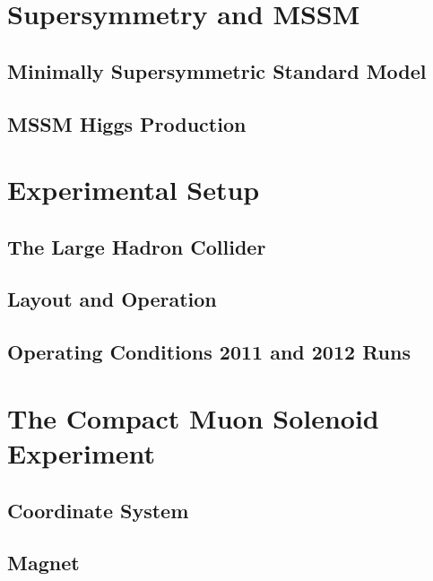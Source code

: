 \documentclass[oneside, letterpaper, 12pt, oldfontcommands]{memoir}
\begin{document}
\chapter{Supersymmetry and MSSM}
\section{Minimally Supersymmetric Standard Model}
\section{MSSM Higgs Production}

\chapter{Experimental Setup}
\section{The Large Hadron Collider}
\section{Layout and Operation}
\section{Operating Conditions 2011 and 2012 Runs}

\chapter{The Compact Muon Solenoid Experiment}
\section{Coordinate System}
\section{Magnet}
\end{document}
